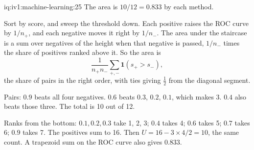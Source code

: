 \begin{solution}{iq:iv1:machine-learning:25}
The area is $10/12 = 0.833$ by each method.

Sort by score, and sweep the threshold down. Each positive raises the ROC curve by $1/n_+$, and each negative moves it right by $1/n_-$. The area under the staircase is a sum over negatives of the height when that negative is passed, $1/n_-$ times the share of positives ranked above it. So the area is
\[
\frac{1}{n_+n_-}\sum_{+, -}\mathbf{1}(s_+ > s_-),
\]
the share of pairs in the right order, with ties giving $\frac12$ from the diagonal segment.

Pairs: $0.9$ beats all four negatives. $0.6$ beats $0.3$, $0.2$, $0.1$, which makes 3. $0.4$ also beats those three. The total is 10 out of 12.

Ranks from the bottom: $0.1, 0.2, 0.3$ take 1, 2, 3; $0.4$ takes 4; $0.6$ takes 5; $0.7$ takes 6; $0.9$ takes 7. The positives sum to 16. Then $U = 16 - 3 \times 4/2 = 10$, the same count. A trapezoid sum on the ROC curve also gives $0.833$.



\end{solution}

